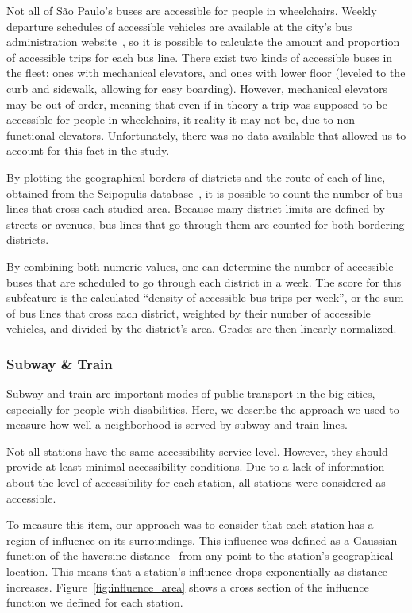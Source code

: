 \documentclass[12pt]{article}
\begin{document}
Not all of São Paulo's buses are accessible for people in wheelchairs.
Weekly departure schedules of accessible vehicles are available at the city's bus administration website~\cite{sptrans},
so it is possible to calculate the amount and proportion of accessible trips for each bus line.
There exist two kinds of accessible buses in the fleet:
ones with mechanical elevators, and ones with lower floor (leveled to the curb and sidewalk, allowing for easy boarding).
However, mechanical elevators may be out of order,
meaning that even if in theory a trip was supposed to be accessible for people in wheelchairs,
it reality it may not be, due to non-functional elevators.
Unfortunately, there was no data available that allowed us to account for this fact in the study.

By plotting the geographical borders of districts and the route of each of line,
obtained from the Scipopulis database~\cite{scipopulis},
it is possible to count the number of bus lines that cross each studied area.
Because many district limits are defined by streets or avenues,
bus lines that go through them are counted for both bordering districts.

By combining both numeric values, one can determine the number of accessible buses
that are scheduled to go through each district in a week.
The score for this subfeature is the calculated ``density of accessible bus trips per week'',
or the sum of bus lines that cross each district,
weighted by their number of accessible vehicles,
and divided by the district's area.
Grades are then linearly normalized.

\subsubsection{Subway \& Train}

Subway and train are important modes of public transport in the big cities, especially for people with disabilities.
Here, we describe the approach we used to measure how well a neighborhood is served by subway and train lines.

Not all stations have the same accessibility service level.
However, they should provide at least minimal accessibility conditions.
Due to a lack of information about the level of accessibility for each station,
all stations were considered as accessible.

To measure this item, our approach was to consider that each station has a region of influence on its surroundings.
This influence was defined as a Gaussian function of the
haversine distance~\cite{van2012heavenly} from any point to the station's geographical location.
This means that a station's influence drops exponentially as distance increases.
Figure~\ref{fig:influence_area} shows a cross section of the influence function we defined for each station.
\end{document}
